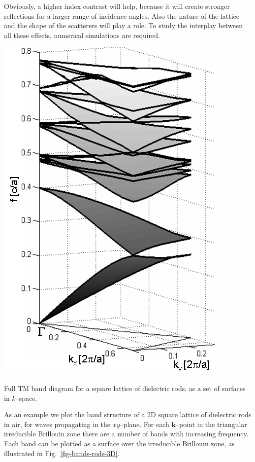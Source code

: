 Obviously, a higher index contrast will help, because it will create stronger reflections for a larger range of incidence angles. Also the nature of the lattice and the shape of the scatterers will play a role. To study the interplay between all these effects, numerical simulations are required.

\begin{marginfigure}
\centering
\includegraphics{symmetry/figures/3d_bands}
\caption{Full TM band diagram for a square lattice of dielectric rods, as a set of surfaces in $k$--space.}
\label{fig-bands-rods-3D}
\end{marginfigure}

As an example we plot the band structure of a 2D square lattice of dielectric rods in air, for waves propagating in the $xy$--plane. For each ${\mathbf k}$--point in the triangular irreducible Brillouin zone there are a number of bands with increasing frequency. Each band can be plotted as a surface over the irreducible Brillouin zone, as illustrated in Fig.~\ref{fig-bands-rods-3D}.

